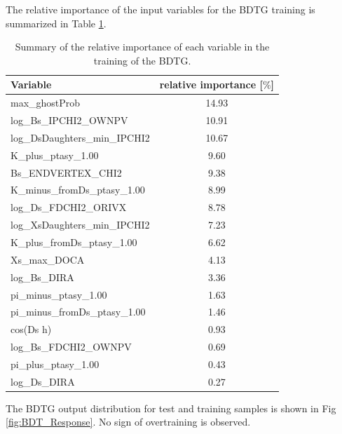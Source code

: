 The relative importance of the input variables for the BDTG training is summarized in Table \ref{table:InputVars}.

\begin{table}[h]
\centering
 \begin{tabular}{l c}
Variable & relative importance [$\%$]\\
  \hline
max\_ghostProb & 14.93\\
log\_Bs\_IPCHI2\_OWNPV & 10.91\\
log\_DsDaughters\_min\_IPCHI2 & 10.67\\
K\_plus\_ptasy\_1.00 & 9.60\\
Bs\_ENDVERTEX\_CHI2 & 9.38\\
K\_minus\_fromDs\_ptasy\_1.00 & 8.99\\
log\_Ds\_FDCHI2\_ORIVX & 8.78\\
log\_XsDaughters\_min\_IPCHI2 & 7.23\\
K\_plus\_fromDs\_ptasy\_1.00 & 6.62\\
Xs\_max\_DOCA & 4.13\\
log\_Bs\_DIRA & 3.36\\
pi\_minus\_ptasy\_1.00 & 1.63\\
pi\_minus\_fromDs\_ptasy\_1.00 & 1.46\\
cos(Ds h) & 0.93\\
log\_Bs\_FDCHI2\_OWNPV & 0.69\\
pi\_plus\_ptasy\_1.00 & 0.43\\
log\_Ds\_DIRA & 0.27\\
\end{tabular}
\caption{Summary of the relative importance of each variable in the training of the BDTG.}
\label{table:InputVars}
\end{table}


 
The BDTG output distribution for test and training samples is shown in Fig \ref{fig:BDT_Response}. No sign of overtraining is observed. 

